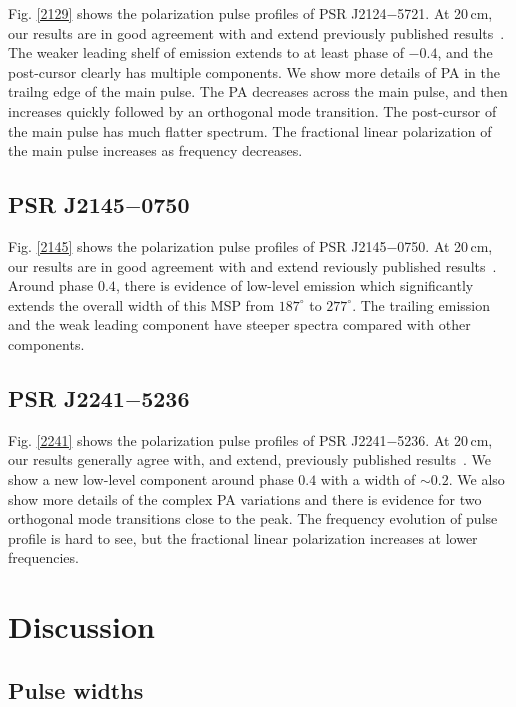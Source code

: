 \documentclass[useAMS,usenatbib]{mn2e}
\begin{document}
Fig. \ref{2129} shows the polarization pulse profiles of 
PSR J2124$-$5721.
%
At 20\,cm, our results are in good agreement with and extend previously 
published results~\citep{Yan11}.
%
The weaker leading shelf of emission extends to at least phase of $-0.4$, and 
the post-cursor clearly has multiple components.
%
We show more details of PA in the trailng edge of the main pulse.  
%
The PA decreases across the main pulse, and then increases quickly followed 
by an orthogonal mode transition.
%
The post-cursor of the main pulse has much flatter spectrum.
%
The fractional linear polarization of the main pulse increases as frequency 
decreases.

\subsection{PSR J2145$-$0750}

Fig. \ref{2145} shows the polarization pulse profiles of 
PSR J2145$-$0750.
%
At 20\,cm, our results are in good agreement with and extend reviously 
published results~\citep{Yan11}.
%
Around phase $0.4$, there is evidence of low-level emission which 
significantly extends the overall width of this MSP from $187^{\circ}$ to 
$277^{\circ}$.
%
The trailing emission and the weak leading component have steeper spectra 
compared with other components.

\subsection{PSR J2241$-$5236}

Fig. \ref{2241} shows the polarization pulse profiles of 
PSR J2241$-$5236.
%
At 20\,cm, our results generally agree with, and extend, previously published 
results~\citep{Keith11}.
%
We show a new low-level component around phase $0.4$ with a width of $\sim 0.2$.
%
We also show more details of the complex PA variations and there is evidence 
for two orthogonal mode transitions close to the peak.
%
The frequency evolution of pulse profile is hard to see, but the fractional 
linear polarization increases at lower frequencies.

\section{Discussion}

\subsection{Pulse widths}
\end{document}
